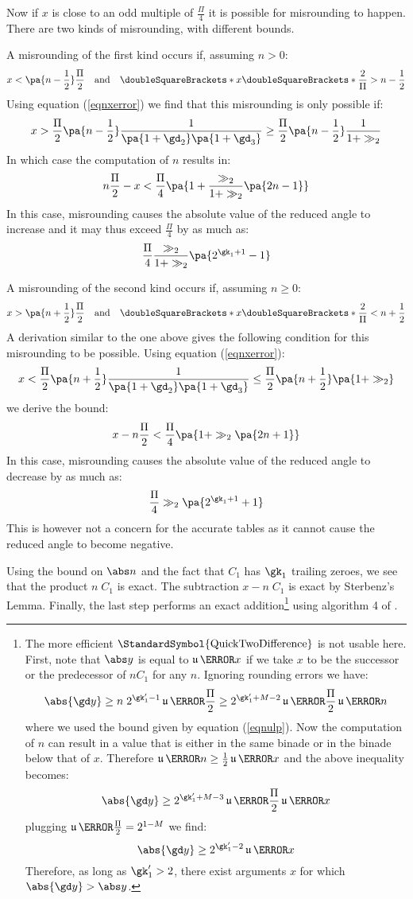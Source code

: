 \documentclass[10pt, a4paper, twoside]{basestyle}
\DeclareMathOperator{\ULP}{\mathfrak u}
\DeclareMathOperator{\quicktwodifference}{\StandardSymbol{QuickTwoDifference}}
\newcommand{\round}[1]{\doubleSquareBrackets*{#1}}
\begin{document}
Now if $x$ is close to an odd multiple of $\frac{\Pi}{4}$ it is possible for misrounding to happen.   There are two kinds of misrounding, with different bounds.

A misrounding of the first kind occurs if, assuming $n > 0$:
\[
x < \pa{n - \frac{1}{2}}\frac{\Pi}{2} \quad \text{and} \quad \round{x \round{\frac{2}{\Pi}}} > n - \frac{1}{2}
\]
Using equation (\ref{eqnxerror}) we find that this misrounding is only possible if:
\[
x > \frac{\Pi}{2} \pa{n - \frac{1}{2}} \frac{1}{\pa{1 + \gd_2} \pa{1 + \gd_3}} \geq \frac{\Pi}{2} \pa{n - \frac{1}{2}} \frac{1}{1 + \gg_2}
\]
In which case the computation of $n$ results in:
\[
n \frac{\Pi}{2} - x < \frac{\Pi}{4} \pa{1 + \frac{\gg_2}{1 + \gg_2} \pa{2 n - 1}}
\]
In this case, misrounding causes the absolute value of the reduced angle to increase and it may thus exceed $\frac{\Pi}{4}$ by as much as:
\begin{equation}
\frac{\Pi}{4} \frac{\gg_2}{1 + \gg_2} \pa{2^{\gk_1 + 1} - 1}
\label{eqnmisroundingbound}
\end{equation}

A misrounding of the second kind occurs if, assuming $n \geq 0$:
\[
x > \pa{n + \frac{1}{2}}\frac{\Pi}{2} \quad \text{and} \quad \round{x \round{\frac{2}{\Pi}}} < n + \frac{1}{2}
\]
A derivation similar to the one above gives the following condition for this misrounding to be possible.  Using equation (\ref{eqnxerror}):
\[
x < \frac{\Pi}{2} \pa{n + \frac{1}{2}} \frac{1}{\pa{1 + \gd_2} \pa{1 + \gd_3}} \leq \frac{\Pi}{2} \pa{n + \frac{1}{2}} \pa{1 + \gg_2}
\]
we derive the bound:
\[
x - n \frac{\Pi}{2} < \frac{\Pi}{4} \pa{1 + \gg_2 \pa{2 n + 1}}
\]
In this case, misrounding causes the absolute value of the reduced angle to decrease by as much as:
\[
\frac{\Pi}{4} \gg_2 \pa{2^{\gk_1 + 1} + 1}
\]
This is however not a concern for the accurate tables as it cannot cause the reduced angle to become negative.

Using the bound on $\abs n$ and the fact that $C_1$ has $\gk_1$ trailing zeroes, we see that the product $n \; C_1$ is exact.  The subtraction $x - n \; C_1$ is exact by Sterbenz's Lemma.  Finally, the last step performs an exact addition\footnote{The more efficient $\quicktwodifference$ is not usable here.  First, note that $\abs y$ is equal to $\ULP\of{x}$ if we take $x$ to be the successor or the predecessor of $n C_1$ for any $n$. Ignoring rounding errors we have:
\[ 
\abs{\gd y} \geq n \; 2^{\gk'_1 - 1} \ULP\of{\frac{\Pi}{2}} \geq 2^{\gk'_1 + M - 2} \ULP\of{\frac{\Pi}{2}} \ULP\of{n}
\]
where we used the bound given by equation (\ref{eqnulp}).  Now the computation of $n$ can result in a value that is either in the same binade or in the binade below that of $x$.  Therefore $\ULP\of{n} \geq \frac{1}{2} \ULP\of{x}$ and the above inequality becomes:
\[
\abs{\gd y} \geq 2^{\gk'_1 + M - 3} \ULP\of{\frac{\Pi}{2}} \ULP\of{x}
\]
plugging $\ULP\of{\frac{\Pi}{2}} = 2^{1 - M}$ we find:
\[
\abs{\gd y} \geq 2^{\gk'_1 - 2} \ULP\of{x}
\]
Therefore, as long as $\gk'_1 > 2$, there exist arguments $x$ for which $\abs{\gd y} > \abs y$.
} using algorithm 4 of \cite{HidaLiBailey2007}.
\end{document}
